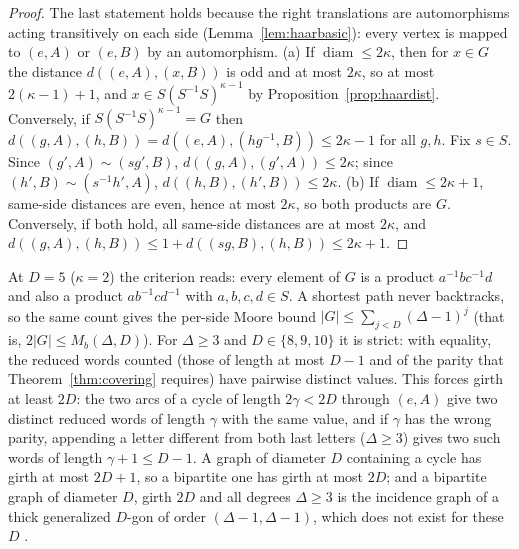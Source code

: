 \documentclass[11pt]{amsart}
\theoremstyle{definition}
\theoremstyle{remark}
\numberwithin{equation}{section}
\newcommand{\Mb}{M_b}
\newcommand{\diam}{\operatorname{diam}}
\begin{document}
\begin{proof}
The last statement holds because the right translations are automorphisms acting transitively on each side
(Lemma~\ref{lem:haarbasic}): every vertex is mapped to $(e,A)$ or $(e,B)$ by an automorphism.
(a) If $\diam\le2\kappa$, then for $x\in G$ the distance $d((e,A),(x,B))$ is odd and at most $2\kappa$, so at most $2(\kappa-1)+1$,
and $x\in S(S^{-1}S)^{\kappa-1}$ by Proposition~\ref{prop:haardist}. Conversely, if $S(S^{-1}S)^{\kappa-1}=G$ then
$d((g,A),(h,B))=d((e,A),(hg^{-1},B))\le2\kappa-1$ for all $g,h$. Fix $s\in S$. Since $(g',A)\sim(sg',B)$,
$d((g,A),(g',A))\le2\kappa$; since $(h',B)\sim(s^{-1}h',A)$, $d((h,B),(h',B))\le2\kappa$.
(b) If $\diam\le2\kappa+1$, same-side distances are even, hence at most $2\kappa$, so both products are $G$. Conversely, if both
hold, all same-side distances are at most $2\kappa$, and $d((g,A),(h,B))\le1+d((sg,B),(h,B))\le2\kappa+1$.
\end{proof}

At $D=5$ ($\kappa=2$) the criterion reads: every element of $G$ is a product $a^{-1}bc^{-1}d$ and also a product $ab^{-1}cd^{-1}$
with $a,b,c,d\in S$. A shortest path never backtracks, so the same count gives the per-side Moore bound
$|G|\le\sum_{j<D}(\Delta-1)^j$ (that is, $2|G|\le\Mb(\Delta,D)$). For $\Delta\ge3$ and $D\in\{8,9,10\}$ it is strict: with
equality, the reduced words counted (those of length at most $D-1$ and of the parity that Theorem~\ref{thm:covering}
requires) have pairwise distinct values. This forces girth at least $2D$: the two arcs of a cycle of length $2\gamma<2D$
through $(e,A)$ give two distinct reduced words of length $\gamma$ with the same value, and if $\gamma$ has the wrong parity,
appending a letter different from both last letters ($\Delta\ge3$) gives two such words of length $\gamma+1\le D-1$. A graph
of diameter $D$ containing a cycle has girth at most $2D+1$, so a bipartite one has girth at most $2D$; and a bipartite graph of diameter $D$, girth $2D$ and all degrees $\Delta\ge3$ is the incidence graph of a thick
generalized $D$-gon of order $(\Delta-1,\Delta-1)$, which does not exist for these $D$ \cite{FeitHigman}.
\end{document}
